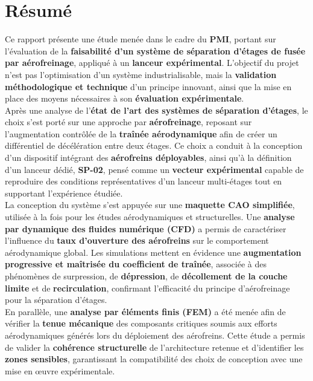 \section*{Résumé}

Ce rapport présente une étude menée dans le cadre du \textbf{\acrfull{PMI}}, portant sur l’évaluation de la \textbf{faisabilité
d’un système de séparation d’étages de fusée par aérofreinage}, appliqué à un \textbf{lanceur expérimental}. L’objectif du
projet n’est pas l’optimisation d’un système industrialisable, mais la \textbf{validation méthodologique et technique} d’un
principe innovant, ainsi que la mise en place des moyens nécessaires à son \textbf{évaluation expérimentale}.\\

Après une analyse de l’\textbf{état de l’art des systèmes de séparation d’étages}, le choix s’est porté sur une approche par
\textbf{aérofreinage}, reposant sur l’augmentation contrôlée de la \textbf{traînée aérodynamique} afin de créer un différentiel
de décélération entre deux étages. Ce choix a conduit à la conception d’un dispositif intégrant des \textbf{aérofreins
déployables}, ainsi qu’à la définition d’un lanceur dédié, \textbf{SP-02}, pensé comme un \textbf{vecteur expérimental} capable
de reproduire des conditions représentatives d’un lanceur multi-étages tout en supportant l’expérience étudiée.\\

La conception du système s’est appuyée sur une \textbf{maquette \acrshort{CAO} simplifiée}, utilisée à la fois pour les études
aérodynamiques et structurelles. Une \textbf{analyse par dynamique des fluides numérique (\acrshort{CFD})} a permis de
caractériser l’influence du \textbf{taux d’ouverture des aérofreins} sur le comportement aérodynamique global. Les simulations
mettent en évidence une \textbf{augmentation progressive et maîtrisée du coefficient de traînée}, associée à des phénomènes de
surpression, de \textbf{dépression}, de \textbf{décollement de la couche limite} et de \textbf{recirculation}, confirmant
l’efficacité du principe d’aérofreinage pour la séparation d’étages.\\

En parallèle, une \textbf{analyse par éléments finis (\acrshort{FEM})} a été menée afin de vérifier la \textbf{tenue mécanique}
des composants critiques soumis aux efforts aérodynamiques générés lors du déploiement des aérofreins. Cette étude a permis de
valider la \textbf{cohérence structurelle} de l’architecture retenue et d’identifier les \textbf{zones sensibles}, garantissant
la compatibilité des choix de conception avec une mise en œuvre expérimentale.\\

